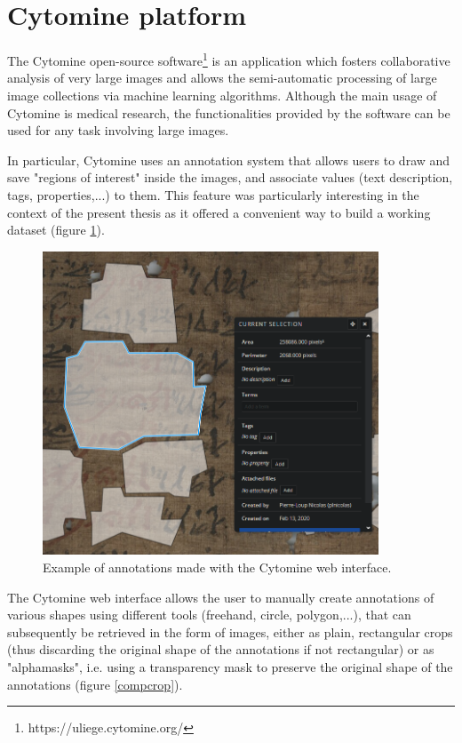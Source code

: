\documentclass[11pt]{report}
\begin{document}
\section{Cytomine platform}

The Cytomine open-source software\footnote{https://uliege.cytomine.org/} is an application which fosters collaborative analysis of very large images and allows the semi-automatic processing of large image collections via machine learning algorithms. Although the main usage of Cytomine is medical research, the functionalities provided by the software can be used for any task involving large images.\newline

In particular, Cytomine uses an annotation system that allows users to draw and save "regions of interest" inside the images, and associate values (text description, tags, properties,...) to them. This feature was particularly interesting in the context of the present thesis as it offered a convenient way to build a working dataset (figure \ref{annotation}).

\begin{figure}[h!]
\centering\includegraphics[width=10cm]{annotation.PNG}
\caption{Example of annotations made with the Cytomine web interface.}
\label{annotation}
\end{figure}

The Cytomine web interface allows the user to manually create annotations of various shapes using different tools (freehand, circle, polygon,...), that can subsequently be retrieved in the form of images, either as plain, rectangular crops (thus discarding the original shape of the annotations if not rectangular) or as "alphamasks", i.e. using a transparency mask to preserve the original shape of the annotations (figure \ref{compcrop}).
\end{document}
